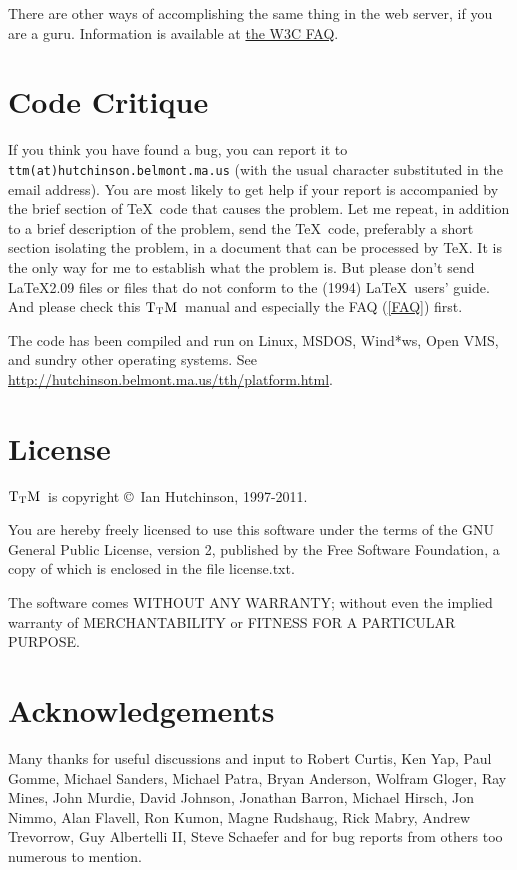 \documentclass[12pt]{article}
\def\TtM{$\rm{}T_TH$}
\def\TtM{$\rm{}T_TM$}%
\begin{document}
There are other ways of accomplishing the same thing in the web
server, if you are a guru. Information is available at 
\href{http://www.w3.org/International/questions/qa-htaccess-charset}{the
  W3C FAQ}.


\section{Code Critique}

If you think you have found a bug, you can report it to
\verb!ttm(at)hutchinson.belmont.ma.us! (with the usual character
substituted in the email address).  You are most likely to get help if
your report is accompanied by the brief section of \TeX\ code that
causes the problem. Let me repeat, in addition to a brief description
of the problem, send the \TeX\ code, preferably a short
section isolating the problem, in a document that can be processed
by \TeX. It is the only way for me to establish
what the problem is. But please don't send \LaTeX2.09 files or files
that do not conform to the (1994) \LaTeX\ users' guide. And
please check this \TtM\ manual and especially the FAQ (\ref{FAQ}) first.

The code has been compiled and run on Linux, MSDOS, Wind*ws, Open VMS,
and sundry other operating systems. See 
\href{http://hutchinson.belmont.ma.us/tth/platform.html}
{http://hutchinson.belmont.ma.us/tth/platform.html}.

\section{License}

\TtM\ is copyright \copyright\ Ian Hutchinson, 1997-2011.

You are hereby freely licensed to use this software under the terms of
the GNU General Public License, version 2, published by the Free
Software Foundation, a copy of which is enclosed in the file
license.txt.

The software comes WITHOUT ANY WARRANTY; without even the implied
warranty of MERCHANTABILITY or FITNESS FOR A PARTICULAR PURPOSE.

\section{Acknowledgements}

Many thanks for useful discussions and input to Robert Curtis, Ken
Yap, Paul Gomme, Michael Sanders, Michael Patra, Bryan Anderson,
Wolfram Gloger, Ray Mines, John Murdie, David Johnson, Jonathan
Barron, Michael Hirsch, Jon Nimmo, Alan Flavell, Ron Kumon, Magne
Rudshaug, Rick Mabry, Andrew Trevorrow, Guy Albertelli II, Steve
Schaefer and for bug
reports from others too numerous to mention.
\end{document}
